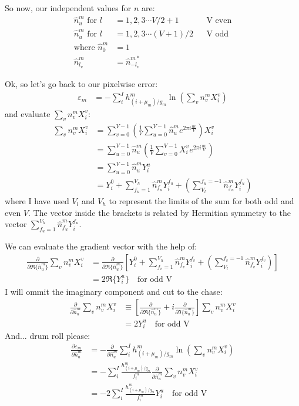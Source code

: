 \documentclass[11pt]{article}
\begin{document}
So now, our independent values for $n$ are:
\begin{align}
   \hat{n}^m_u \text{  for } l &= 1, 2, 3 \cdots V/2 + 1 &&\text{V even}\\
   \hat{n}^m_u \text{  for } l &= 1, 2, 3 \cdots (V+1)/2 &&\text{V odd}\\
\text{where  }   \hat{n}^m_0 &= 1   && \\
                 \hat{n}^m_{l_v} &= \hat{n}^{m*}_{-l_v} &&
\end{align}

Ok, so let's go back to our pixelwise error:
\begin{align}
   \varepsilon_m &= - \sum_i^I h^m_{(i+\mu_m)/g_m} \ln\left(\sum_v n^m_v X^v_i\right)
\end{align}
and evaluate $\sum_v n^m_v X^v_i$:
\begin{align}
   \sum_v n^m_v X^v_i &= \sum_{v=0}^{V-1} \left( \frac{1}{V} \sum_{u=0}^{V-1} \hat{n}^m_u e^{2\pi i \frac{u v}{V}} \right) X^v_i \\
   &= \sum_{u=0}^{V-1} \hat{n}^m_u  \left( \frac{1}{V}  \sum_{v=0}^{V-1}  X^v_i e^{2\pi i \frac{u v}{V}}\right) \\
   &= \sum_{u=0}^{V-1} \hat{n}^m_u  Y^u_i \\
   &= Y^0_i + \sum_{f_u=1}^{V_h} \hat{n}^m_{f_u} Y^{f_u}_i + \left(\sum_{V_l}^{f_u=-1} \hat{n}^m_{f_u} Y^{f_u}_i\right) 
\end{align}
where I have used $V_l$ and $V_h$ to represent the limits of the sum for both odd and even $V$. The vector inside the brackets is related by Hermitian symmetry to the vector $\sum_{f_u=1}^{V_h} \hat{n}^m_{f_u} Y^{f_u}_i$.

We can evaluate the gradient vector with the help of:
\begin{align*}
   \frac{\partial}{\partial \Re\{ \hat{n}^m_u \}} \sum_v n^m_v X^v_i &= \frac{\partial}{\partial \Re\{ \hat{n}^m_u \}}\left[Y^0_i + \sum_{f_v=1}^{V_h} \hat{n}^m_{f_v} Y^{f_v}_i + \left(\sum_{V_l}^{f_v=-1} \hat{n}^m_{f_v} Y^{f_v}_i\right) \right] \\
   &= 2 \Re\{Y^{u}_i\} \quad \text{for odd V} 
\end{align*}
I will ommit the imaginary component and cut to the chase:
\begin{align*}
   \frac{\partial}{\partial \hat{n}^m_u} \sum_v n^m_v X^v_i &\equiv \left[\frac{\partial}{\partial \Re\{ \hat{n}^m_u \}} + i \frac{\partial}{\partial \Im\{ \hat{n}^m_u \}}\right]  \sum_v n^m_v X^v_i \\
   &= 2 Y^{u}_i \quad \text{for odd V} 
\end{align*}
And... drum roll please:
\begin{align*}
   \frac{\partial \varepsilon_m}{\partial \hat{n}^m_u}  &= -\frac{\partial}{\partial \hat{n}^m_u} \sum_i^I h^m_{(i+\mu_m)/g_m} \ln\left(\sum_v n^m_v X^v_i\right) \\
   &= - \sum_i^I \frac{h^m_{(i+\mu_m)/g_m}}{f^m_i} \frac{\partial}{\partial \hat{n}^m_u} \sum_v n^m_v X^v_i \\
   &= - 2 \sum_i^I \frac{h^m_{(i+\mu_m)/g_m}}{f^m_i} Y^{u}_i \quad \text{for odd V} 
\end{align*}
\end{document}
